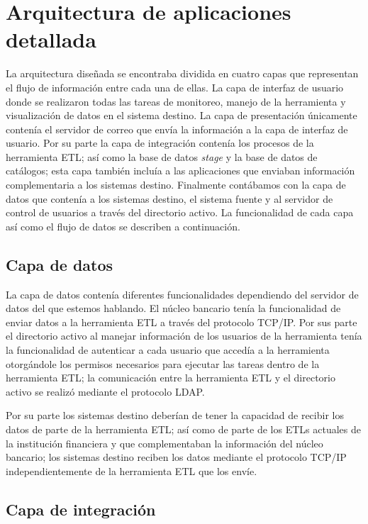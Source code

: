 \section{Arquitectura de aplicaciones detallada}

La arquitectura diseñada se encontraba dividida en cuatro capas que representan
el flujo de información entre cada una de ellas. La capa de interfaz de usuario
donde se realizaron todas las tareas de monitoreo, manejo de la herramienta y
visualización de datos en el sistema destino. La capa de presentación únicamente
contenía el servidor de correo que envía la información a la capa de interfaz de
usuario. Por su parte la capa de integración contenía los procesos de la
herramienta ETL; así como la base de datos \emph{stage} y la base de datos de
catálogos; esta capa también incluía a las aplicaciones que enviaban información
complementaria a los sistemas destino. Finalmente contábamos con la capa de
datos que contenía a los sistemas destino, el sistema fuente y al servidor de
control de usuarios a través del directorio activo. La funcionalidad de cada
capa así como el flujo de datos se describen a continuación.

\subsection{Capa de datos}

La capa de datos contenía diferentes funcionalidades dependiendo del servidor de
datos del que estemos hablando. El núcleo bancario tenía la funcionalidad de
enviar datos a la herramienta ETL a través del protocolo TCP/IP. Por sus parte
el directorio activo al manejar información de los usuarios de la herramienta
tenía la funcionalidad de autenticar a cada usuario que accedía a la herramienta
otorgándole los permisos necesarios para ejecutar las tareas dentro de la
herramienta ETL; la comunicación entre la herramienta ETL y el directorio activo
se realizó mediante el protocolo LDAP.

Por su parte los sistemas destino deberían de tener la capacidad de recibir los
datos de parte de la herramienta ETL; así como de parte de los ETLs actuales de
la institución financiera y que complementaban la información del núcleo
bancario; los sistemas destino reciben los datos mediante el protocolo TCP/IP
independientemente de la herramienta ETL que los envíe.

\subsection{Capa de integración}

